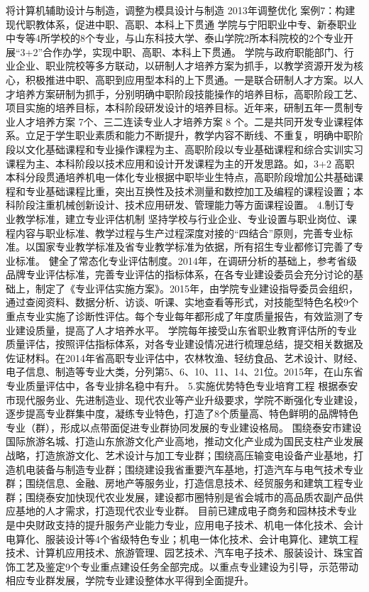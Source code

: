 将计算机辅助设计与制造，调整为模具设计与制造
2013年调整优化
案例7：构建现代职教体系，促进中职、高职、本科上下贯通
学院与宁阳职业中专、新泰职业中专等4所学校的8个专业，与山东科技大学、泰山学院2所本科院校的2个专业开展“3+2”合作办学，实现中职、高职、本科上下贯通。
学院与政府职能部门、行业企业、职业院校等多方联动，以研制人才培养方案为抓手，以教学资源开发为核心，积极推进中职、高职到应用型本科的上下贯通。一是联合研制人才方案。以人才培养方案研制为抓手，分别明确中职阶段技能操作的培养目标，高职阶段工艺、项目实施的培养目标，本科阶段研发设计的培养目标。近年来，研制五年一贯制专业人才培养方案 7个、三二连读专业人才培养方案 8 个。二是共同开发专业课程体系。立足于学生职业素质和能力不断提升，教学内容不断线、不重复，明确中职阶段以文化基础课程和专业操作课程为主、高职阶段以专业基础课程和综合实训实习课程为主、本科阶段以技术应用和设计开发课程为主的开发思路。如，3+2 高职本科分段贯通培养机电一体化专业根据中职毕业生特点，高职阶段增加公共基础课程和专业基础课程比重，突出互换性及技术测量和数控加工及编程的课程设置；本科阶段注重机械创新设计、技术应用研发、管理能力等方面课程设置。
4.制订专业教学标准，建立专业评估机制
坚持学校与行业企业、专业设置与职业岗位、课程内容与职业标准、教学过程与生产过程深度对接的“四结合”原则，完善专业标准。以国家专业教学标准及省专业教学标准为依据，所有招生专业都修订完善了专业标准。
健全了常态化专业评估制度。2014年，在调研分析的基础上，参考省级品牌专业评估标准，完善专业评估的指标体系，在各专业建设委员会充分讨论的基础上，制定了《专业评估实施方案》。2015年，由学院专业建设指导委员会组织，通过查阅资料、数据分析、访谈、听课、实地查看等形式，对技能型特色名校9个重点专业实施了诊断性评估。每个专业每年都形成了年度质量报告，有效监测了专业建设质量，提高了人才培养水平。
学院每年接受山东省职业教育评估所的专业质量评估，按照评估指标体系，对各专业建设情况进行梳理总结，提交相关数据及佐证材料。在2014年省高职专业评估中，农林牧渔、轻纺食品、艺术设计、财经、电子信息、制造等专业大类，分列第5、6、10、11、14、21位。2015年，在山东省专业质量评估中，各专业排名稳中有升。
5.实施优势特色专业培育工程
根据泰安市现代服务业、先进制造业、现代农业等产业升级要求，学院不断强化专业建设，逐步提高专业群集中度，凝练专业特色，打造了8个质量高、特色鲜明的品牌特色专业（群），形成以点带面促进专业群协同发展的专业建设格局。
围绕泰安市建设国际旅游名城、打造山东旅游文化产业高地，推动文化产业成为国民支柱产业发展战略，打造旅游文化、艺术设计与加工专业群；围绕高压输变电设备产业基地，打造机电装备与制造专业群；围绕建设我省重要汽车基地，打造汽车与电气技术专业群；围绕信息、金融、房地产等服务业，打造信息技术、经贸服务和建筑工程专业群；围绕泰安加快现代农业发展，建设都市圈特别是省会城市的高品质农副产品供应基地的人才需求，打造现代农业专业群。
目前已建成电子商务和园林技术专业是中央财政支持的提升服务产业能力专业，应用电子技术、机电一体化技术、会计电算化、服装设计等4个省级特色专业；机电一体化技术、会计电算化、建筑工程技术、计算机应用技术、旅游管理、园艺技术、汽车电子技术、服装设计、珠宝首饰工艺及鉴定9个专业重点建设任务全部完成。以重点专业建设为引导，示范带动相应专业群发展，学院专业建设整体水平得到全面提升。











